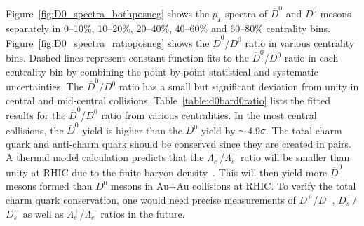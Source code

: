 \documentclass[%
 reprint,	
showpacs,
 amsmath,amssymb,
 aps,
 prc,
]{revtex4-1}
\providecommand{\DIFaddtex}[1]{{\protect\color{blue}\uwave{#1}}} %
\providecommand{\DIFdeltex}[1]{{\protect\color{red}\sout{#1}}}                      %
\providecommand{\DIFaddbegin}{} %
\providecommand{\DIFaddend}{} %
\providecommand{\DIFdelbegin}{} %
\providecommand{\DIFdelend}{} %
\providecommand{\DIFadd}[1]{\texorpdfstring{\DIFaddtex{#1}}{#1}} %
\providecommand{\DIFdel}[1]{\texorpdfstring{\DIFdeltex{#1}}{}} %
\begin{document}
Figure~\ref{fig:D0_spectra_bothposneg} shows the $p_{T}$ spectra of $\overline{D}^{0}$ and $D^0$ mesons separately in 0--10\%, 10--20\%, 20--40\%, 40--60\% and 60--80\% centrality bins. Figure~\ref{fig:D0_spectra_ratioposneg} shows the $\overline{D}^{0}$/$D^{0}$ ratio in various centrality bins. Dashed lines represent constant function fits to the $\overline{D}^{0}$/$D^{0}$ ratio in each centrality bin by combining the point-by-point statistical and systematic uncertainties. The $\overline{D}^0/D^0$ ratio has a small but significant deviation from unity in central and mid-central collisions. Table~\ref{table:d0bard0ratio} lists the fitted results for the $\overline{D}^{0}$/$D^0$ ratio from various centralities. In the most central collisions, the $\overline{D}^{0}$ yield is higher than the $D^0$ yield by \DIFdelbegin \DIFdel{$\sim$}\DIFdelend \DIFaddbegin \DIFadd{$\approx$}\DIFaddend \,4.9$\sigma$. The total charm quark and anti-charm quark should be conserved since they are created in pairs. A thermal model calculation predicts that the $\Lambda_{c}^-$/$\Lambda_{c}^+$ ratio will be smaller than unity at RHIC due to the finite baryon density~\cite{ANDRONIC200336}. This will then yield more 
$\overline{D}^{0}$ mesons formed than $D^0$ mesons in Au+Au collisions at RHIC. To verify the total charm quark conservation, one would need precise measurements of $D^{+}$/$D^{-}$, $D_{s}^{+}$/$D_{s}^{-}$ as well as $\Lambda_{c}^+$/$\Lambda_{c}^-$ ratios in the future.

\begin{table}[t]
\end{table}
\end{document}
